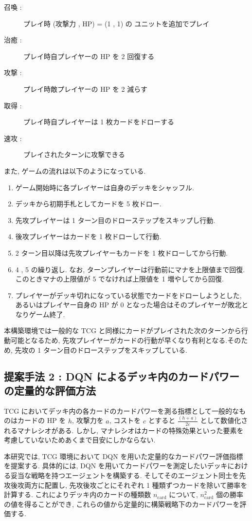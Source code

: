 \documentclass[twocolumn]{jarticle}
\begin{document}
\begin{description}
   \vspace{-0.15cm}
   \setlength{\itemsep}{0cm}
   \small
  \item[召喚 :]  プレイ時 (攻撃力 , HP) = (1 , 1) の
  ユニットを追加でプレイ
  \item[治癒 :]  プレイ時自プレイヤーの HP を 2 回復する
  \item[攻撃 :]  プレイ時敵プレイヤーの HP を 2 減らす
  \item[取得 :]  プレイ時自プレイヤーは 1 枚カードをドローする
  \item[速攻 :]  プレイされたターンに攻撃できる
\end{description}
\vspace{-0.3cm}
また, ゲームの流れは以下のようになっている.
\begin{enumerate}
  \small
  \vspace{-0.15cm}
  \setlength{\itemsep}{0cm} %
  \item ゲーム開始時に各プレイヤーは自身のデッキをシャッフル.
  \item デッキから初期手札としてカードを 5 枚ドロー. 
  \item 先攻プレイヤーは 1 ターン目のドローステップをスキップし行動.
  \item 後攻プレイヤーはカードを 1 枚ドローして行動.
  \item 2 ターン目以降は先攻プレイヤーもカードを 1 枚ドローしてから行動. 
  \item 4 , 5 の繰り返し. なお, ターンプレイヤーは行動前にマナを上限値まで回復. このときマナの上限値が 5 でなければ上限値を 1 増やしてから回復.
  \item プレイヤーがデッキ切れになっている状態でカードをドローしようとした, あるいはプレイヤー自身の HP が 0 となった場合はそのプレイヤーが敗北となりゲーム終了.
\end{enumerate}
\vspace{-0.15cm}
\par
本構築環境では一般的な TCG と同様にカードがプレイされた次のターンから行動可能となるため, 先攻プレイヤーがカードの行動が早くなり有利となる.そのため, 先攻の 1 ターン目のドローステップをスキップしている. 

\subsection{提案手法 2 : DQN によるデッキ内のカードパワーの定量的な評価方法}
\label{manaratio}
TCG においてデッキ内の各カードのカードパワーを測る指標として一般的なものはカードの HP を $h$, 攻撃力を $a$, コストを $c$ とすると $\frac{(h + a)}{2c} $ として数値化されるマナレシオがある. 
しかし, マナレシオはカードの特殊効果といった要素を考慮していないためあくまで目安にしかならない. \par
本研究では, TCG 環境において DQN を用いた定量的なカードパワー評価指標を提案する.
具体的には, DQN を用いてカードパワーを測定したいデッキにおける妥当な戦略を持つエージェントを構築する. 
そしてそのエージェント同士を先攻後攻両方に配置し, 先攻後攻ごとにそれぞれ 1 種類ずつカードを除いて勝率を計算する. これによりデッキ内のカードの種類数 $n_{\mathrm{card}}$ について, $n_{\mathrm{card}}^2$ 個の勝率の値を得ることができ, これらの値から定量的に構築戦略下のカードパワーを評価する. 
\end{document}
